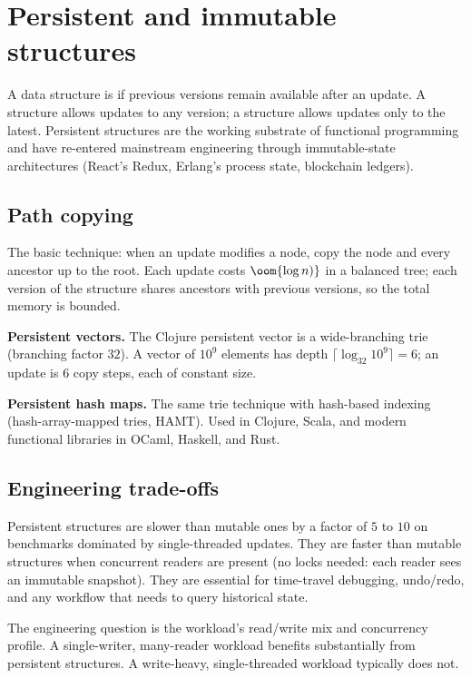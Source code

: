 \section{Persistent and immutable structures}

A data structure is  if previous versions remain available after an update. A  structure allows updates to any version; a  structure allows updates only to the latest. Persistent structures are the working substrate of functional programming and have re-entered mainstream engineering through immutable-state architectures (React's Redux, Erlang's process state, blockchain ledgers).

\subsection{Path copying}

The basic technique: when an update modifies a node, copy the node and every ancestor up to the root. Each update costs $\oom{\log n)}$ in a balanced tree; each version of the structure shares ancestors with previous versions, so the total memory is bounded.

\textbf{Persistent vectors.} The Clojure persistent vector is a wide-branching trie (branching factor $32$). A vector of $10^9$ elements has depth $\lceil \log_{32} 10^9 \rceil = 6$; an update is $6$ copy steps, each of constant size.

\textbf{Persistent hash maps.} The same trie technique with hash-based indexing (hash-array-mapped tries, HAMT). Used in Clojure, Scala, and modern functional libraries in OCaml, Haskell, and Rust.

\subsection{Engineering trade-offs}

Persistent structures are slower than mutable ones by a factor of $5$ to $10$ on benchmarks dominated by single-threaded updates. They are faster than mutable structures when concurrent readers are present (no locks needed: each reader sees an immutable snapshot). They are essential for time-travel debugging, undo/redo, and any workflow that needs to query historical state.

The engineering question is the workload's read/write mix and concurrency profile. A single-writer, many-reader workload benefits substantially from persistent structures. A write-heavy, single-threaded workload typically does not.

